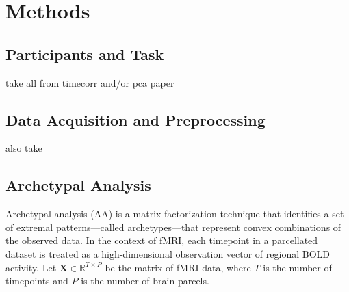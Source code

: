 \documentclass[12pt]{article}
\begin{document}





\section*{Methods}


\subsection*{Participants and Task}
take all from timecorr and/or pca paper

\subsection*{Data Acquisition and Preprocessing}
also take

\subsection*{Archetypal Analysis}

Archetypal analysis (AA) is a matrix factorization technique that identifies a set of extremal patterns—called archetypes—that represent convex combinations of the observed data. In the context of fMRI, each timepoint in a parcellated dataset is treated as a high-dimensional observation vector of regional BOLD activity. Let $\mathbf{X} \in \mathbb{R}^{T \times P}$ be the matrix of fMRI data, where $T$ is the number of timepoints and $P$ is the number of brain parcels.
\end{document}
